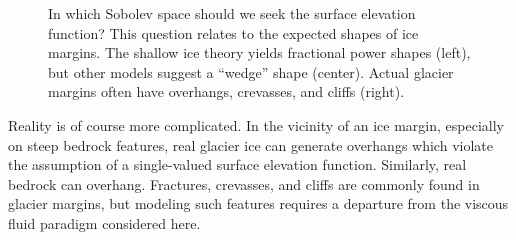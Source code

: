 \documentclass[hidelinks,onefignum,onetabnum,final]{siamart220329}  %
\begin{document}
\begin{figure}[ht]
\begin{center}
\end{center}

\vspace{-2mm}

\caption{In which Sobolev space should we seek the surface elevation function?  This question relates to the expected shapes of ice margins.  The shallow ice theory yields fractional power shapes (left), but other models suggest a ``wedge'' shape (center).  Actual glacier margins often have overhangs, crevasses, and cliffs (right).}
\label{fig:margins}
\end{figure}

Reality is of course more complicated.  In the vicinity of an ice margin, especially on steep bedrock features, real glacier ice can generate overhangs which violate the assumption of a single-valued surface elevation function.  Similarly, real bedrock can overhang.  Fractures, crevasses, and cliffs are commonly found in glacier margins, but modeling such features requires a departure from the viscous fluid paradigm considered here.
  
\end{document}
